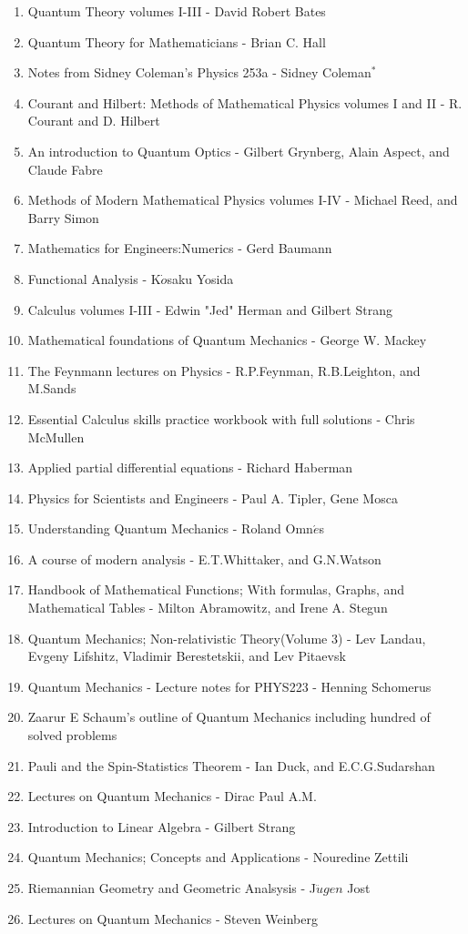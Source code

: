 \documentclass[10pt,fancy]{elegantbook}
\begin{document}
\begin{enumerate}

\item Quantum Theory volumes I-III - David Robert Bates 
\item Quantum Theory for Mathematicians - Brian C. Hall  
\item Notes from Sidney Coleman's Physics 253a - Sidney Coleman$^*$  
\item Courant and Hilbert: Methods of Mathematical Physics volumes I and II - R. Courant and D. Hilbert 
\item An introduction to Quantum Optics - Gilbert Grynberg, Alain Aspect, and Claude Fabre  
\item Methods of Modern Mathematical Physics volumes I-IV - Michael Reed, and Barry Simon 
\item Mathematics for Engineers:Numerics - Gerd Baumann 
\item Functional Analysis - K$\dot{o}$saku Yosida  
\item Calculus volumes I-III - Edwin "Jed" Herman and Gilbert Strang  
\item Mathematical foundations of Quantum Mechanics - George W. Mackey 
\item The Feynmann lectures on Physics - R.P.Feynman, R.B.Leighton, and M.Sands  
\item Essential Calculus skills practice workbook with full solutions - Chris McMullen  
\item Applied partial differential equations - Richard Haberman  
\item Physics for Scientists and Engineers - Paul A. Tipler, Gene Mosca  
\item Understanding Quantum Mechanics - Roland Omn$\acute{e}$s  
\item A course of modern analysis - E.T.Whittaker, and G.N.Watson  
\item Handbook of Mathematical Functions; With formulas, Graphs, and Mathematical Tables - Milton Abramowitz, and Irene A. Stegun 
\item Quantum Mechanics; Non-relativistic Theory(Volume 3) - Lev Landau, Evgeny Lifshitz, Vladimir Berestetskii, and Lev Pitaevsk  
\item Quantum Mechanics - Lecture notes for PHYS223 - Henning Schomerus 
\item Zaarur E Schaum's outline of Quantum Mechanics including hundred of solved problems  
\item Pauli and the Spin-Statistics Theorem - Ian Duck, and E.C.G.Sudarshan 
\item Lectures on Quantum Mechanics - Dirac Paul A.M.  
\item Introduction to Linear Algebra - Gilbert Strang  
\item Quantum Mechanics; Concepts and Applications - Nouredine Zettili  
\item Riemannian Geometry and Geometric Analsysis - J$\ddot{u}gen$ Jost  
\item Lectures on Quantum Mechanics - Steven Weinberg

\end{enumerate}



\printindex
\end{document}
